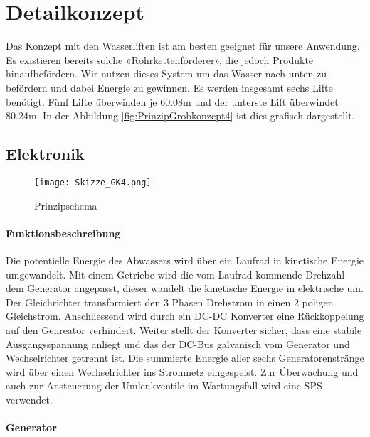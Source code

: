 \section{Detailkonzept} \label{sec:detailkonzept}

Das Konzept mit den Wasserliften ist am besten geeignet für unsere Anwendung. Es existieren bereits solche «Rohrkettenförderer», die jedoch Produkte hinaufbefördern. Wir nutzen dieses System um das Wasser nach unten zu befördern und dabei Energie zu gewinnen. Es werden insgesamt sechs Lifte benötigt. Fünf Lifte überwinden je 60.08\si{m} und der unterste Lift überwindet 80.24\si{m}. In der Abbildung \ref{fig:PrinzipGrobkonzept4}  ist dies grafisch dargestellt.

\subsection{Elektronik}

\begin{figure}[H]
\centering
\texttt{[image: Skizze\_GK4.png]}
\caption{Prinzipschema}
\label{fig:Prinzipschema}
\end{figure}

\paragraph{Funktionsbeschreibung}

Die potentielle Energie des Abwassers wird über ein Laufrad in kinetische Energie umgewandelt. Mit einem Getriebe wird die vom Laufrad kommende Drehzahl dem Generator angepasst, dieser wandelt die kinetische Energie in elektrische um. Der Gleichrichter transformiert den 3 Phasen Drehstrom in einen 2 poligen Gleichstrom. Anschliessend wird durch ein DC-DC Konverter eine Rückkoppelung auf den Genreator verhindert. Weiter stellt der Konverter sicher, dass eine stabile Ausgangsspannung anliegt und das der DC-Bus galvanisch vom Generator und Wechselrichter getrennt ist. Die summierte Energie aller sechs Generatorenstränge wird über einen Wechselrichter ins Stromnetz eingespeist. Zur Überwachung und auch zur Ansteuerung der Umlenkventile im Wartungsfall wird eine SPS verwendet.

\paragraph{Generator}


